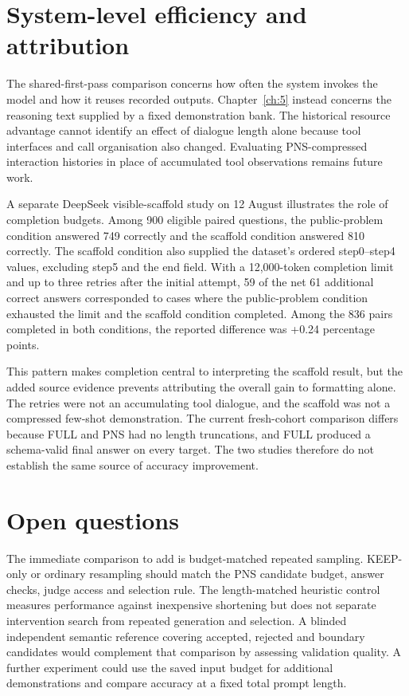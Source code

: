 \section{System-level efficiency and attribution}\label{sec:7.4}

The shared-first-pass comparison concerns how often the system invokes the model and how it reuses recorded outputs. Chapter~\ref{ch:5} instead concerns the reasoning text supplied by a fixed demonstration bank. The historical resource advantage cannot identify an effect of dialogue length alone because tool interfaces and call organisation also changed. Evaluating PNS-compressed interaction histories in place of accumulated tool observations remains future work.

A separate DeepSeek visible-scaffold study on 12 August illustrates the role of completion budgets. Among 900 eligible paired questions, the public-problem condition answered 749 correctly and the scaffold condition answered 810 correctly. The scaffold condition also supplied the dataset's ordered step0--step4 values, excluding step5 and the end field. With a 12,000-token completion limit and up to three retries after the initial attempt, 59 of the net 61 additional correct answers corresponded to cases where the public-problem condition exhausted the limit and the scaffold condition completed. Among the 836 pairs completed in both conditions, the reported difference was +0.24 percentage points.

This pattern makes completion central to interpreting the scaffold result, but the added source evidence prevents attributing the overall gain to formatting alone. The retries were not an accumulating tool dialogue, and the scaffold was not a compressed few-shot demonstration. The current fresh-cohort comparison differs because FULL and PNS had no length truncations, and FULL produced a schema-valid final answer on every target. The two studies therefore do not establish the same source of accuracy improvement.

\section{Open questions}\label{sec:7.5}

The immediate comparison to add is budget-matched repeated sampling. KEEP-only or ordinary resampling should match the PNS candidate budget, answer checks, judge access and selection rule. The length-matched heuristic control measures performance against inexpensive shortening but does not separate intervention search from repeated generation and selection. A blinded independent semantic reference covering accepted, rejected and boundary candidates would complement that comparison by assessing validation quality. A further experiment could use the saved input budget for additional demonstrations and compare accuracy at a fixed total prompt length.
